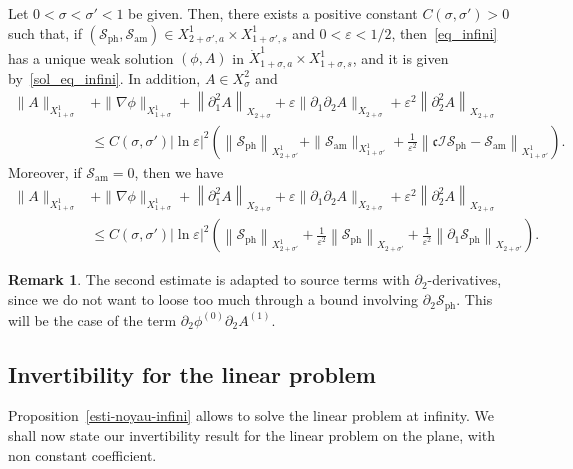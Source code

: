 \documentclass[10pt]{amsart}
\theoremstyle{definition}\newtheorem{defi}[theo]{Definition}\newtheorem{rema}[theo]{Remark}\newtheorem{exam}[theo]{Example}\newtheorem{exem}[theo]{Example}\newtheorem{nota}[theo]{Notation}
\newcommand*\p{\partial}
\newcommand{\amm}{\mathrm{am}}
\newcommand{\phl}{\mathrm{ph}}
\newcommand*\BI{\mathcal{I}}
\newcommand*\BS{\mathcal{S}}
\newcommand*\cs{{\mathfrak c}}
\newcommand*\ls{\leqslant }
\newcommand*\e{\varepsilon}
\newcommand*\lne{\lvert \ln \varepsilon \rvert}
\newcommand*\s{\sigma}
\begin{document}
\begin{prop}\label{esti-noyau-infini}
Let $ 0 < \s < \s' < 1 $ be given. Then, there exists a positive constant $ C (\s, \s') > 0 $ such that, if $ (\BS_{\phl}, \BS_{\amm})
\in X^{1}_{2+\s', a} \times X^{1}_{1+\s', s} $ and $ 0 < \e < 1/2 $, then~\eqref{eq_infini} has a unique weak solution $(\phi,A) $ in $ \dot{X}^1_{ 1 + \s, a } \times X^{1}_{ 1+ \s, s} $, and it is given by~\eqref{sol_eq_infini}. In addition, $ A \in X^2_\s $ and
\begin{align*}
\| A \|_{ X^{1}_{ 1+\s} } & + \| \nabla \phi \|_{ X^{1}_{ 1 +\s} } + \left\| \p_1^2 A \right\|_{ X_{2 +\s} } + \e \| \p_1 \p_2 A \|_{ X_{2 +\s} } + \e^2 \left\| \p_2^2 A \right\|_{ X_{2+\s} }
\\ & \ls C (\s, \s') \lne^2
\left(
\left\| \BS_{\phl} \right\|_{ X^{1}_{2+\s' } } + \| \BS_{\amm} \|_{ X^{1 }_{ 1+ \s'} } + \frac{1}{\e^2} \left\| \cs \BI \BS_{\phl} - \BS_{\amm} \right\|_{ X^{1}_{ 1 + \s' } }
\right).
\end{align*}
Moreover, if $ \BS_{\amm} = 0 $, then we have
\begin{align*}
\| A \|_{ X^{1}_{ 1+\s} } & + \| \nabla \phi \|_{ X^{1}_{ 1 +\s} } + \left\| \p_1^2 A \right\|_{ X_{2 +\s} } + \e \| \p_1 \p_2 A \|_{ X_{2 +\s} } + \e^2 \left\| \p_2^2 A \right\|_{ X_{2+\s} }
\\& \ls C (\s, \s') \lne^2
\left(
\left\| \BS_{\phl} \right\|_{ X^{1}_{2+\s' } } + \frac{1}{\e^2} \left\| \BS_{\phl} \right\|_{ X_{ 2 + \s' } } + \frac{1}{\e^2} \left\| \p_1 \BS_{\phl} \right\|_{ X_{ 2 + \s' } }
\right).
\end{align*}
\end{prop}

\begin{rema}
The second estimate is adapted to source terms with $ \p_2 $-derivatives, since we do not want to loose too much through a bound involving $ \p_2 \BS_{\phl} $. This will be the case of the term $ \p_2 \phi^{(0)} \p_2 A^{(1)} $.
\end{rema}



\subsection{Invertibility for the linear problem}


Proposition~\ref{esti-noyau-infini} allows to solve the linear problem at infinity. We shall now state our invertibility result for the linear problem on the plane, with non constant coefficient.
\end{document}

